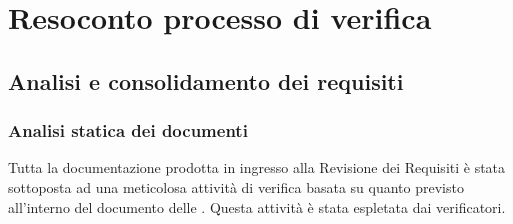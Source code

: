 \section{Resoconto processo di verifica} \label{_resocontoVerifica}

\subsection{Analisi e consolidamento dei requisiti}

\subsubsection{Analisi statica dei documenti}
Tutta la documentazione prodotta in ingresso alla Revisione dei Requisiti è stata sottoposta ad una meticolosa attività di verifica
basata su quanto previsto all'interno del documento delle .
Questa attività è stata espletata dai verificatori.

